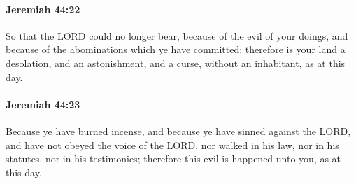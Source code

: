 		\paragraph{Jeremiah 44:22} %
			\label{JEREMIAH-44-22}

			So that the LORD could no longer bear, because of the evil of your doings, and because of the abominations which ye have committed; therefore is your land a desolation, and an astonishment, and a curse, without an inhabitant, as at this day.


		\paragraph{Jeremiah 44:23} %
			\label{JEREMIAH-44-23}

			Because ye have burned incense, and because ye have sinned against the LORD, and have not obeyed the voice of the LORD, nor walked in his law, nor in his statutes, nor in his testimonies; therefore this evil is happened unto you, as at this day.

